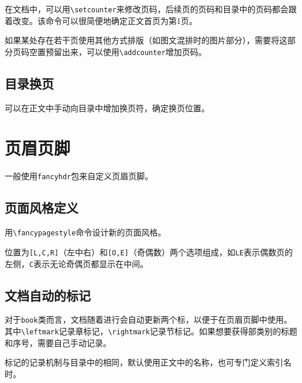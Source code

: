 \documentclass[10pt,openany]{book}
\begin{document}
在文档中，可以用\texttt{\textbackslash{}setcounter}来修改页码，后续页的页码和目录中的页码都会跟着改变。该命令可以很简便地确定正文首页为第1页。



如果某处存在若干页使用其他方式排版（如图文混排时的图片部分），需要将这部分页码空置预留出来，可以使用\texttt{\textbackslash{}addcounter}增加页码。



\section{目录换页}

可以在正文中手动向目录中增加换页符，确定换页位置。



\chapter{页眉页脚}

一般使用\texttt{fancyhdr}包来自定义页眉页脚。

\section{页面风格定义}

用\texttt{\textbackslash{}fancypagestyle}命令设计新的页面风格。



位置为\texttt{[L,C,R]}（左中右）和\texttt{[O,E]}（奇偶数）两个选项组成，如\texttt{LE}表示偶数页的左侧，\texttt{C}表示无论奇偶页都显示在中间。

\section{文档自动的标记}

对于\texttt{book}类而言，文档随着进行会自动更新两个标，以便于在页眉页脚中使用。其中\texttt{\textbackslash{}leftmark}记录章标记，\texttt{\textbackslash{}rightmark}记录节标记。如果想要获得部类别的标题和序号，需要自己手动记录。

标记的记录机制与目录中的相同，默认使用正文中的名称，也可专门定义索引名时。


\end{document}

